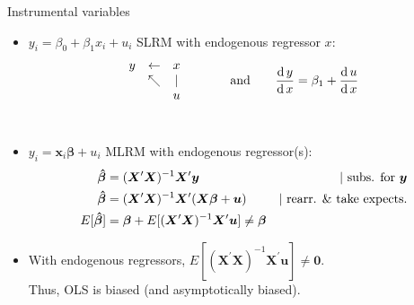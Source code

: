 \documentclass[usenames,dvipsnames]{beamer}
\begin{document}
\begin{frame}{Instrumental variables}
\begin{itemize}
    \item $y_i = \beta_0 + \beta_1 x_i + u_i$ \qquad SLRM with endogenous regressor $x$:
    $$
    \begin{matrix}
    y & \leftarrow & x \\
      & \nwarrow & | \\
      & & u
    \end{matrix}
    \qquad \qquad \textnormal{and} \qquad
    \frac{\textnormal{d} \, y}{\textnormal{d} \, x} = \beta_1 + \frac{\textnormal{d} \, u}{\textnormal{d} \, x}
    $$
    ~\\
    \item $y_i = \bm{x}_i \bm{\beta} + u_i$ \qquad MLRM with endogenous regressor(s):
    \begin{align*}
    \bm{\hat{\beta}} &= (\bm{X}^{\prime}\bm{X})^{-1} \bm{X}^{\prime}\bm{y} &|~ \textnormal{subs. for~} \bm{y} \\
    \bm{\hat{\beta}} &= (\bm{X}^{\prime}\bm{X})^{-1} \bm{X}^{\prime}(\bm{X \beta} + \bm{u}) &|~ \textnormal{rearr. \& take expects.} \\
    E[\bm{\hat{\beta}}] &= \bm{\beta} + E[(\bm{X}^{\prime}\bm{X})^{-1} \bm{X}^{\prime}\bm{u}] \neq \bm{\beta}
    \end{align*}
    \item With endogenous regressors, $E[(\bm{X}^{\prime}\bm{X})^{-1} \bm{X}^{\prime}\bm{u}] \neq \bm{0}$. \\Thus, OLS is biased (and asymptotically biased).
\end{itemize}
\end{frame}
\end{document}
